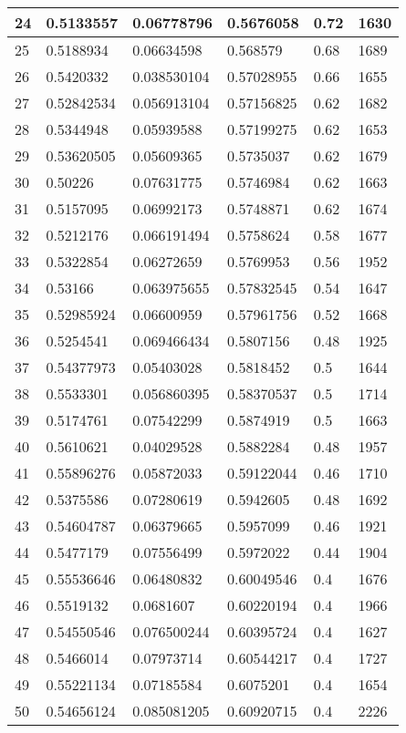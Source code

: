 \begin{longtable}{|l|l|l|l|l|l|}
24 & 0.5133557 & 0.06778796 & 0.5676058 & 0.72 & 1630 \\ \hline 
25 & 0.5188934 & 0.06634598 & 0.568579 & 0.68 & 1689 \\ \hline 
26 & 0.5420332 & 0.038530104 & 0.57028955 & 0.66 & 1655 \\ \hline 
27 & 0.52842534 & 0.056913104 & 0.57156825 & 0.62 & 1682 \\ \hline 
28 & 0.5344948 & 0.05939588 & 0.57199275 & 0.62 & 1653 \\ \hline 
29 & 0.53620505 & 0.05609365 & 0.5735037 & 0.62 & 1679 \\ \hline 
30 & 0.50226 & 0.07631775 & 0.5746984 & 0.62 & 1663 \\ \hline 
31 & 0.5157095 & 0.06992173 & 0.5748871 & 0.62 & 1674 \\ \hline 
32 & 0.5212176 & 0.066191494 & 0.5758624 & 0.58 & 1677 \\ \hline 
33 & 0.5322854 & 0.06272659 & 0.5769953 & 0.56 & 1952 \\ \hline 
34 & 0.53166 & 0.063975655 & 0.57832545 & 0.54 & 1647 \\ \hline 
35 & 0.52985924 & 0.06600959 & 0.57961756 & 0.52 & 1668 \\ \hline 
36 & 0.5254541 & 0.069466434 & 0.5807156 & 0.48 & 1925 \\ \hline 
37 & 0.54377973 & 0.05403028 & 0.5818452 & 0.5 & 1644 \\ \hline 
38 & 0.5533301 & 0.056860395 & 0.58370537 & 0.5 & 1714 \\ \hline 
39 & 0.5174761 & 0.07542299 & 0.5874919 & 0.5 & 1663 \\ \hline 
40 & 0.5610621 & 0.04029528 & 0.5882284 & 0.48 & 1957 \\ \hline 
41 & 0.55896276 & 0.05872033 & 0.59122044 & 0.46 & 1710 \\ \hline 
42 & 0.5375586 & 0.07280619 & 0.5942605 & 0.48 & 1692 \\ \hline 
43 & 0.54604787 & 0.06379665 & 0.5957099 & 0.46 & 1921 \\ \hline 
44 & 0.5477179 & 0.07556499 & 0.5972022 & 0.44 & 1904 \\ \hline 
45 & 0.55536646 & 0.06480832 & 0.60049546 & 0.4 & 1676 \\ \hline 
46 & 0.5519132 & 0.0681607 & 0.60220194 & 0.4 & 1966 \\ \hline 
47 & 0.54550546 & 0.076500244 & 0.60395724 & 0.4 & 1627 \\ \hline 
48 & 0.5466014 & 0.07973714 & 0.60544217 & 0.4 & 1727 \\ \hline 
49 & 0.55221134 & 0.07185584 & 0.6075201 & 0.4 & 1654 \\ \hline 
50 & 0.54656124 & 0.085081205 & 0.60920715 & 0.4 & 2226 \\ \hline 
\end{longtable}
